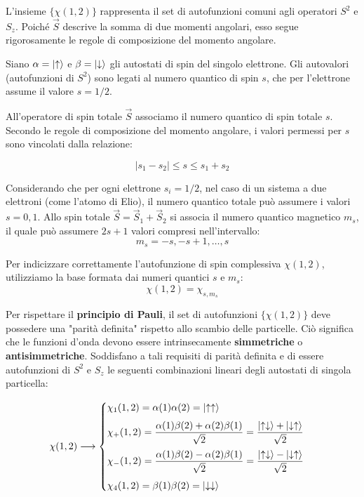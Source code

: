 L'insieme \(\{\chi(1, 2)\}\) rappresenta il set di autofunzioni comuni agli operatori \(S^2\) e \(S_z\). Poiché \(\vec{S}\) descrive la somma di due momenti angolari, esso segue rigorosamente le regole di composizione del momento angolare.

Siano \(\alpha = \ket{\uparrow}\) e \(\beta = \ket{\downarrow}\) gli autostati di spin del singolo elettrone. Gli autovalori (autofunzioni di \(S^2\)) sono legati al numero quantico di spin \(s\), che per l'elettrone assume il valore \(s=1/2\).

All'operatore di spin totale \(\vec{S}\) associamo il numero quantico di spin totale \(s\). Secondo le regole di composizione del momento angolare, i valori permessi per \(s\) sono vincolati dalla relazione:

\begin{importantbox}
    \begin{equation}
        |s_1 - s_2| \le s \le s_1 + s_2 
    \end{equation}
\end{importantbox}

Considerando che per ogni elettrone \(s_i = 1/2\), nel caso di un sistema a due elettroni (come l'atomo di Elio), il numero quantico totale può assumere i valori \(s = 0, 1\). Allo spin totale \(\vec{S} = \vec{S}_1 + \vec{S}_2\) si associa il numero quantico magnetico \(m_s\), il quale può assumere \(2s+1\) valori compresi nell'intervallo:
\begin{equation}
    m_s = -s, -s+1, \dots, s
\end{equation}

Per indicizzare correttamente l'autofunzione di spin complessiva \(\chi(1,2)\), utilizziamo la base formata dai numeri quantici \(s\) e \(m_s\):
\begin{equation}
    \chi(1,2) = \chi_{s, m_s}
\end{equation}

Per rispettare il \textbf{principio di Pauli}, il set di autofunzioni \(\{\chi(1,2)\}\) deve possedere una "parità definita" rispetto allo scambio delle particelle. Ciò significa che le funzioni d'onda devono essere intrinsecamente \textbf{simmetriche} o \textbf{antisimmetriche}.
Soddisfano a tali requisiti di parità definita e di essere autofunzioni di \(S^2\) e \(S_z\) le seguenti combinazioni lineari degli autostati di singola particella:

\begin{equation}
    \chi(1,2) \longrightarrow
    \begin{cases}
        \chi_1(1,2) = \alpha(1)\alpha(2) = \ket{\uparrow\uparrow} \\[1.5ex]
        \chi_+(1,2) = \displaystyle\frac{\alpha(1)\beta(2) + \alpha(2)\beta(1)}{\sqrt{2}} = \frac{\ket{\uparrow\downarrow} + \ket{\downarrow\uparrow}}{\sqrt{2}} \\[2.5ex]
        \chi_-(1,2) = \displaystyle\frac{\alpha(1)\beta(2) - \alpha(2)\beta(1)}{\sqrt{2}} = \frac{\ket{\uparrow\downarrow} - \ket{\downarrow\uparrow}}{\sqrt{2}} \\[2.5ex]
        \chi_4(1,2) = \beta(1)\beta(2) = \ket{\downarrow\downarrow}
    \end{cases}
\end{equation}

